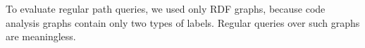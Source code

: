 \documentclass[
11pt,%
tightenlines,%
twoside,%
onecolumn,%
nobibnotes,%
nofootinbib,%
superscriptaddress,%
noshowpacs,%
longbibliography,%
centertags]%
{revtex4-2}
\begin{document}

To evaluate regular path queries, we used only RDF graphs, because code analysis graphs contain only two types of labels. Regular queries over such graphs are meaningless.
\end{document}
